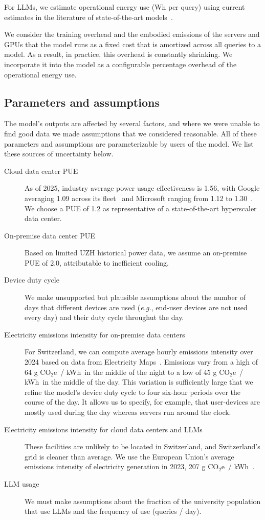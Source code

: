 \documentclass[11pt]{article}
\newcommand{\eg}{{\em e.g.}}
\newcommand{\coe}{CO$_2$e}
\newcommand{\gcoe}{g \coe}
\newcommand{\gcoekwh}{\gcoe\ / kWh}
\begin{document}
For LLMs, we estimate operational energy use (Wh per query) using current estimates in the literature of state-of-the-art models~\cite{devries2023growing,epoch2025howmuchenergydoeschatgptuse}.

We consider the training overhead and the embodied emissions of the servers and GPUs that the model runs as a fixed cost that is amortized across all queries to a model. As a result, in practice, this overhead is constantly shrinking. We incorporate it into the model as a configurable percentage overhead of the operational energy use.

\subsection{Parameters and assumptions}

The model's outputs are affected by several factors, and where we were unable to find good data we made assumptions that we considered reasonable. All of these parameters and assumptions are parameterizable by users of the model. We list these sources of uncertainty below.

\begin{description}
  \item[Cloud data center PUE] As of 2025, industry average power usage effectiveness is 1.56, with Google averaging 1.09 across its fleet~\cite{google:datacenter:efficiency} and Microsoft ranging from 1.12 to 1.30~\cite{microsoft:datacenter:efficiency}. We choose a PUE of 1.2 as representative of a state-of-the-art hyperscaler data center.
  \item[On-premise data center PUE] Based on limited UZH historical power data, we assume an on-premise PUE of 2.0, attributable to inefficient cooling.
  \item[Device duty cycle] We make unsupported but plausible assumptions about the number of days that different devices are used (\eg, end-user devices are not used every day) and their duty cycle throughut the day.
  \item[Electricity emissions intensity for on-premise data centers] For Switzerland, we can compute average hourly emissions intensity over 2024 based on data from Electricity Maps~\cite{electricitymaps}. Emissions vary from a high of 64 \gcoekwh\ in the middle of the night to a low of 45 \gcoekwh\ in the middle of the day. This variation is sufficiently large that we refine the model's device duty cycle to four six-hour periods over the course of the day. It allows us to specify, for example, that user-devices are mostly used during the day whereas servers run around the clock.
  \item[Electricity emissions intensity for cloud data centers and LLMs] These facilities are unlikely to be located in Switzerland, and Switzerland's grid is cleaner than average. We use the European Union's average emissions intensity of electricity generation in 2023, 207 \gcoekwh~\cite{eea:emissions:2025}.
  \item[LLM usage] We must make assumptions about the fraction of the university population that use LLMs and the frequency of use (queries / day).
\end{description}
\end{document}

